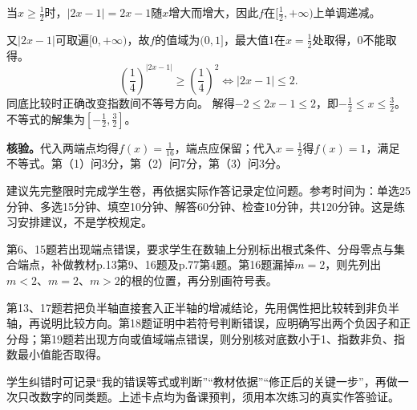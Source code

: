 当$x\ge\frac12$时，$|2x-1|=2x-1$随$x$增大而增大，因此$f$在$[\frac12,+\infty)$上单调递减。

又$|2x-1|$可取遍$[0,+\infty)$，故$f$的值域为$(0,1]$，最大值1在$x=\frac12$处取得，0不能取得。
\[
\left(\frac14\right)^{|2x-1|}\ge\left(\frac14\right)^2
\iff |2x-1|\le2.
\]
同底比较时正确改变指数间不等号方向。
解得$-2\le2x-1\le2$，即$-\frac12\le x\le\frac32$。
不等式的解集为$\boxed{[-\frac12,\frac32]}$。

\textbf{核验。}代入两端点均得$f(x)=\frac1{16}$，端点应保留；代入$x=\frac12$得$f(x)=1$，满足不等式。第（1）问3分，第（2）问7分，第（3）问3分。

建议先完整限时完成学生卷，再依据实际作答记录定位问题。参考时间为：单选25分钟、多选15分钟、填空10分钟、解答60分钟、检查10分钟，共120分钟。这是练习安排建议，不是学校规定。

第6、15题若出现端点错误，要求学生在数轴上分别标出根式条件、分母零点与集合端点，补做教材p.13第9、16题及p.77第4题。第16题漏掉$m=2$，则先列出$m<2$、$m=2$、$m>2$的根的位置，再分别画符号表。

第13、17题若把负半轴直接套入正半轴的增减结论，先用偶性把比较转到非负半轴，再说明比较方向。第18题证明中若符号判断错误，应明确写出两个负因子和正分母；第19题若出现方向或值域端点错误，则分别核对底数小于1、指数非负、指数最小值能否取得。

学生纠错时可记录“我的错误等式或判断”“教材依据”“修正后的关键一步”，再做一次只改数字的同类题。上述卡点均为备课预判，须用本次练习的真实作答验证。

